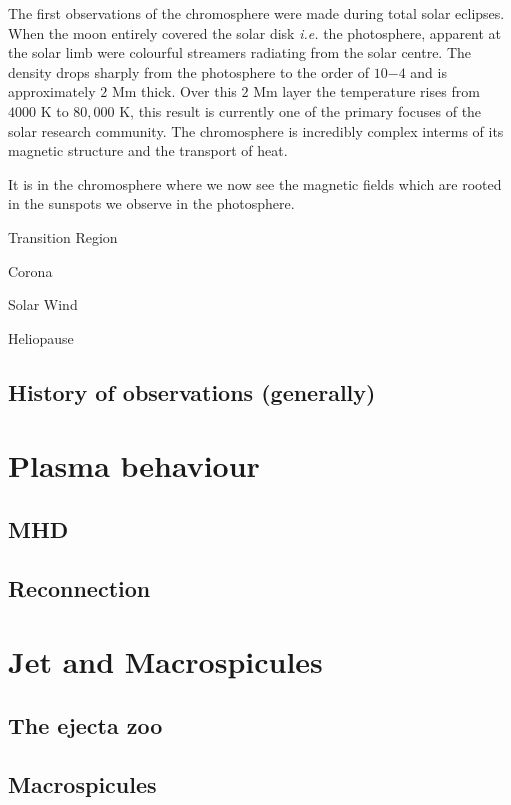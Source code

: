 The first observations of the chromosphere were made during total solar eclipses.
When the moon entirely covered the solar disk \emph{i.e.} the photosphere, apparent at the solar limb were colourful streamers radiating from the solar centre.
The density drops sharply from the photosphere to the order of $10{-4}$ and is approximately $2$ Mm thick. 
Over this $2$ Mm layer the temperature rises from $4000$ K to $80,000$ K, this result is currently one of the primary focuses of the solar research community.
The chromosphere is incredibly complex interms of its magnetic structure and the transport of heat.

It is in the chromosphere where we now see the magnetic fields which are rooted in the sunspots we observe in the photosphere. 

Transition Region

Corona

Solar Wind

Heliopause

\subsection{History of observations (generally)}

\section{Plasma behaviour}

\subsection{MHD}

\subsection{Reconnection}

\section{Jet and Macrospicules}

\subsection{The ejecta zoo}

\subsection{Macrospicules}

